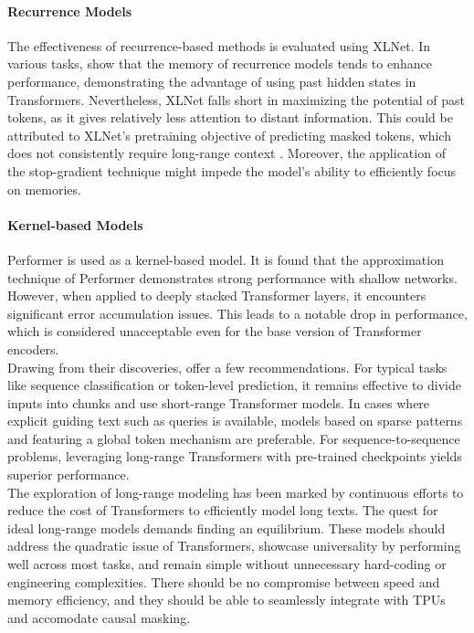 \paragraph{Recurrence Models} 

The effectiveness of recurrence-based methods is evaluated using XLNet. In various tasks, \citet{qin2022nlp} show that the memory of recurrence models tends to enhance performance, demonstrating the advantage of using past hidden states in Transformers. Nevertheless, XLNet falls short in maximizing the potential of past tokens, as it gives relatively less attention to distant information. This could be attributed to XLNet's pretraining objective of predicting masked tokens, which does not consistently require long-range context \citep{sun2021long}. Moreover, the application of the stop-gradient technique might impede the model's ability to efficiently focus on memories.

\paragraph{Kernel-based Models} 

Performer is used as a kernel-based model. It is found that the approximation technique of Performer demonstrates strong performance with shallow networks. However, when applied to deeply stacked Transformer layers, it encounters significant  error accumulation issues. This leads to a notable drop in performance, which is considered unacceptable even for the base version of Transformer encoders. \\

Drawing from their discoveries, \citet{qin2022nlp} offer a few recommendations. For typical tasks like sequence classification or token-level prediction, it remains effective to divide inputs into chunks and use short-range Transformer models. In cases where explicit guiding text such as queries is available, models based on sparse patterns and featuring a global token mechanism are preferable. For sequence-to-sequence problems, leveraging long-range Transformers with pre-trained checkpoints yields superior performance. \\

The exploration of long-range modeling has been marked by continuous efforts to reduce the cost of Transformers to efficiently model long texts. The quest for ideal long-range models demands finding an equilibrium. These models should address the quadratic issue of Transformers, showcase universality by performing well across most tasks, and remain simple without unnecessary hard-coding or engineering complexities. There should be no compromise between speed and memory efficiency, and they should be able to seamlessly integrate with TPUs and accomodate causal masking. 


